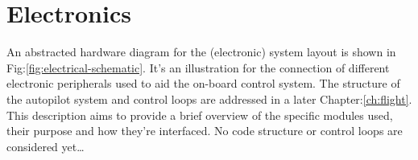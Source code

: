 \section{Electronics}
\label{sec:proto.layout}
{\centering
{}
}
\newpage
An abstracted hardware diagram for the (electronic) system layout is shown in Fig:\ref{fig:electrical-schematic}. It's an illustration for the connection of different electronic peripherals used to aid the on-board control system. The structure of the autopilot system and control loops are addressed in a later Chapter:\ref{ch:flight}. This description aims to provide a brief overview of the specific modules used, their purpose and how they're interfaced. No code structure or control loops are considered yet\ldots
